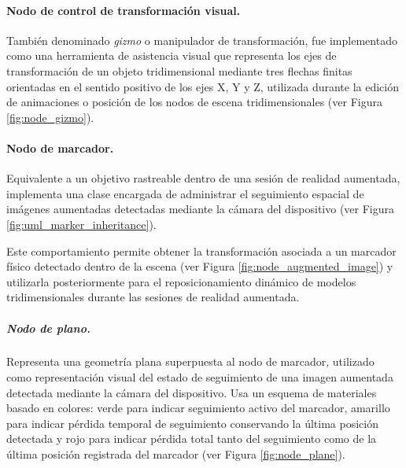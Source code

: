                 

            \paragraph{Nodo de control de transformación visual.}
            
                También denominado \textit{gizmo} o manipulador de transformación, fue implementado como una herramienta de asistencia visual que representa los ejes de transformación de un objeto tridimensional mediante tres flechas finitas orientadas en el sentido positivo de los ejes X, Y y Z, utilizada durante la edición de animaciones o posición de los nodos de escena tridimensionales (ver Figura \ref{fig:node_gizmo}).
            
                

            \paragraph{Nodo de marcador.}
            
                Equivalente a un objetivo rastreable dentro de una sesión de realidad aumentada, implementa una clase encargada de administrar el seguimiento espacial de imágenes aumentadas detectadas mediante la cámara del dispositivo (ver Figura \ref{fig:uml_marker_inheritance}). 

                
            
                Este comportamiento permite obtener la transformación asociada a un marcador físico detectado dentro de la escena (ver Figura \ref{fig:node_augmented_image}) y utilizarla posteriormente para el reposicionamiento dinámico de modelos tridimensionales durante las sesiones de realidad aumentada.

                

                \subparagraph{Nodo de plano.}

                    Representa una geometría plana superpuesta al nodo de marcador, utilizado como representación visual del estado de seguimiento de una imagen aumentada detectada mediante la cámara del dispositivo. Usa un esquema de materiales basado en colores: verde para indicar seguimiento activo del marcador, amarillo para indicar pérdida temporal de seguimiento conservando la última posición detectada y rojo para indicar pérdida total tanto del seguimiento como de la última posición registrada del marcador (ver Figura \ref{fig:node_plane}).


